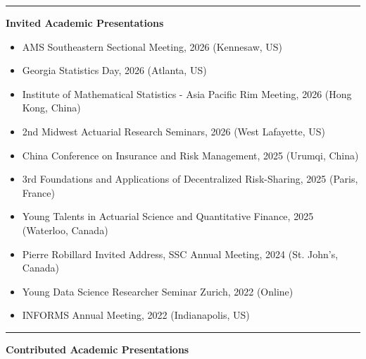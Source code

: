 \documentclass[10pt]{article}
\begin{document}
\rule[4pt]{17cm}{0.3pt}
\medskip
{\large \bf Invited Academic Presentations}
\medskip
\nopagebreak[4]

\begin{itemize}
  \item AMS Southeastern Sectional Meeting, 2026 (Kennesaw, US)
  \item Georgia Statistics Day, 2026 (Atlanta, US)
  \item Institute of Mathematical Statistics - Asia Pacific Rim Meeting, 2026 (Hong Kong, China)
  \item 2nd Midwest Actuarial Research Seminars, 2026 (West Lafayette, US)
  \item China Conference on Insurance and Risk Management, 2025 (Urumqi, China)
  \item 3rd Foundations and Applications of Decentralized Risk-Sharing, 2025 (Paris, France)
  \item Young Talents in Actuarial Science and Quantitative Finance, 2025 (Waterloo, Canada)
  \item Pierre Robillard Invited Address, SSC Annual Meeting, 2024 (St. John's, Canada)
  \item Young Data Science Researcher Seminar Zurich, 2022 (Online)
  \item INFORMS Annual Meeting, 2022 (Indianapolis, US)
\end{itemize}

\rule[4pt]{17cm}{0.3pt}
\medskip
{\large \bf Contributed Academic Presentations}
\medskip
\nopagebreak[4]
\end{document}
